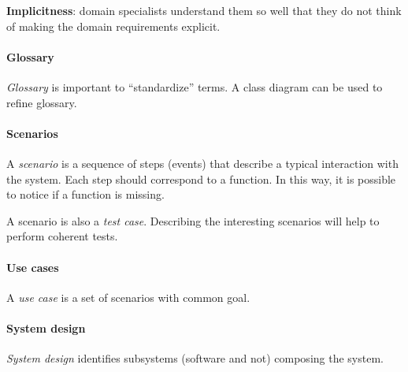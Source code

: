 \textbf{Implicitness}: domain specialists understand them so well that they do not think of making the domain requirements explicit.

\paragraph{Glossary}
\emph{Glossary} is important to ``standardize'' terms. A class diagram can be used to refine glossary.

\paragraph{Scenarios}
A \emph{scenario} is a sequence of steps (events) that describe a typical interaction with the system. Each step should correspond to a function. In this way, it is possible to notice if a function is missing.

A scenario is also a \emph{test case}. Describing the interesting scenarios will help to perform 
coherent tests.

\paragraph{Use cases}
A \emph{use case} is a set of scenarios with common goal.

\paragraph{System design}
\emph{System design} identifies subsystems (software and not) composing the system.